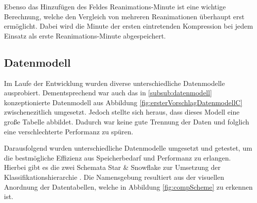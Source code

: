 Ebenso das Hinzufügen des Feldes \glqq Reanimations-Minute\grqq{} ist eine wichtige Berechnung, welche den Vergleich von mehreren Reanimationen überhaupt erst ermöglicht.
Dabei wird die Minute der ersten eintretenden Kompression bei jedem Einsatz als erste \glqq Reanimations-Minute\grqq{} abgespeichert. 

\subsection{Datenmodell}
\label{sub:datenmodell}
Im Laufe der Entwicklung wurden diverse unterschiedliche Datenmodelle ausprobiert.
Dementsprechend war auch das in \ref{subsub:datenmodell} konzeptionierte Datenmodell aus Abbildung \ref{fig:ersterVorschlagDatenmodellC} zwischenezitlich umgesetzt.
Jedoch stellte sich heraus, dass dieses Modell eine große Tabelle abbildet.
Dadurch war keine gute Trennung der Daten und folglich eine verschlechterte Performanz zu spüren.

Darausfolgend wurden unterschiedliche Datenmodelle umgesetzt und getestet, um die bestmögliche Effizienz aus Speicherbedarf und Performanz zu erlangen.
Hierbei gibt es die zwei Schemata \glqq Star\grqq{} \& \glqq Snowflake\grqq{} zur Umsetzung der Klassifikationshierarchie \cite{Kimball.2013}.
Die Namensgebung resultiert aus der visuellen Anordnung der Datentabellen, welche in Abbildung \ref{fig:compScheme} zu erkennen ist.

